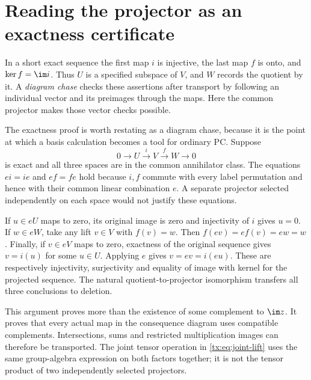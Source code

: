 \section{Reading the projector as an exactness certificate}
In a short exact sequence the first map $i$ is injective, the last
map $f$ is onto, and $\ker f=\im i$. Thus $U$ is a specified
subspace of $V$, and $W$ records the quotient by it. A
\emph{diagram chase} checks these assertions after transport by
following an individual vector and its preimages through the maps.
Here the common projector makes those vector checks possible.

The exactness proof is worth restating as a diagram chase, because
it is the point at which a basis calculation becomes a tool for
ordinary PC. Suppose
\[
 0\longrightarrow U\xrightarrow{i}V\xrightarrow{f}W\longrightarrow0
\]
is exact and all three spaces are in the common annihilator class.
The equations $ei=ie$ and $ef=fe$ hold because $i,f$ commute with
every label permutation and hence with their common linear combination
$e$. A separate projector selected independently on each space would
not justify these equations.

If $u\in eU$ maps to zero, its original image is zero and injectivity
of $i$ gives $u=0$. If $w\in eW$, take any lift $v\in V$ with
$f(v)=w$. Then $f(ev)=e f(v)=ew=w$. Finally, if $v\in eV$ maps
to zero, exactness of the original sequence gives $v=i(u)$ for some
$u\in U$. Applying $e$ gives $v=ev=i(eu)$. These are respectively
injectivity, surjectivity and equality of image with kernel for the
projected sequence. The natural quotient-to-projector isomorphism
transfers all three conclusions to deletion.

This argument proves more than the existence of some complement to
$\im z$. It proves that every actual map in the consequence diagram
uses compatible complements. Intersections, sums and restricted
multiplication images can therefore be transported. The joint tensor
operation in \eqref{tx:eq:joint-lift} uses the same group-algebra
expression on both factors together; it is not the tensor product
of two independently selected projectors.

